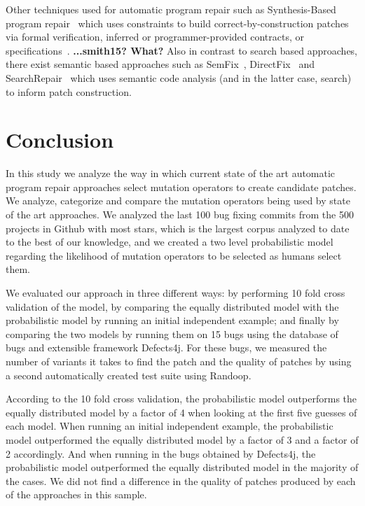 \documentclass[conference]{IEEEtran}
\newcommand{\todo}[1]
  {{\scriptsize \textbf{\color{red} {#1}}}}
\begin{document}
Other techniques used for
automatic program repair such as Synthesis-Based program
repair~\cite{jin11,pei14} which uses constraints to build
correct-by-construction patches via formal verification, inferred or
programmer-provided contracts, or
specifications~\cite{smith15}.\todo{...smith15?  What?} Also in contrast to
search based approaches, there exist semantic based approaches such as
SemFix~\cite{nguyen13}, DirectFix~\cite{mechtaev15} and SearchRepair~\cite{ke15}
which uses semantic code analysis (and in the latter case, search) to inform
patch construction.


\section{Conclusion} \label{conclusion}
In this study we analyze the way in which current state of the art automatic 
program repair approaches select mutation operators to create candidate 
patches. We analyze, categorize and compare the mutation operators being used by 
state of the art approaches. We analyzed the last 100 bug fixing commits from the
500 projects in Github with most stars, which is the largest corpus analyzed to date
to the best of our knowledge, and we created a two level probabilistic model regarding 
the likelihood of mutation operators to be selected as humans select them.

We evaluated our approach in three different ways: by performing 10 fold cross 
validation of the model, by comparing the equally distributed model with the probabilistic model by running an initial independent example; and finally by  comparing the two models by running them on 15 bugs using the database of bugs and extensible 
framework Defects4j. For these bugs, we measured the number of variants it takes to find the patch and the quality of patches by using a second automatically created test suite using Randoop. 

According to the 10 fold cross validation, the probabilistic model outperforms the equally distributed model by a factor of 4 when looking at the first five guesses of each model. When running an initial independent example, the probabilistic model outperformed the equally distributed model by a factor of 3 and a factor of 2 accordingly. And when running in the bugs obtained by Defects4j, the probabilistic model outperformed the equally distributed model in the majority of the cases. We did not find a difference in the quality of patches produced by each of the approaches in this sample.
\end{document}

